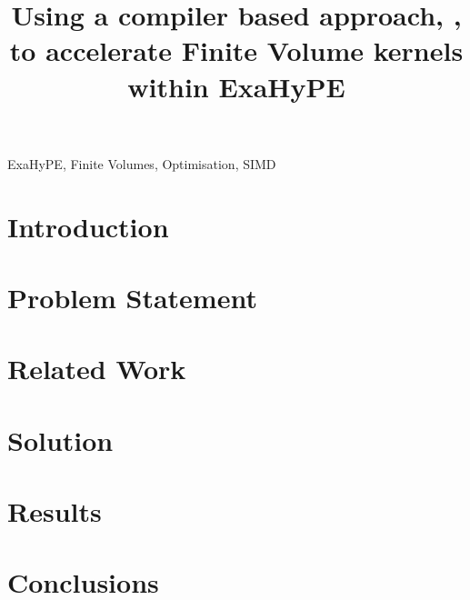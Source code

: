\documentclass[12pt,a4paper]{article}
\title{Using a compiler based approach, \phlat, to accelerate Finite Volume kernels within ExaHyPE}
\author{} %
\date{}
\newif\iftesting
\newcommand{\testingbreak}{\iftesting \pagebreak \fi}%
\begin{document}
\maketitle

\begin{abstract}

\end{abstract}

\begin{keywords}
ExaHyPE, Finite Volumes, Optimisation, SIMD
\end{keywords}

\testingbreak
\section{Introduction}


\testingbreak
\section{Problem Statement}\label{sec:problem_statement}


\testingbreak
\section{Related Work}



\testingbreak
\section{Solution}\label{sec:methodology}


%

\testingbreak
\section{Results}\label{sec:results}



\testingbreak
\section{Conclusions}


\testingbreak
%
\printbibliography

\iftesting
\pagebreak

\fi
\end{document}

